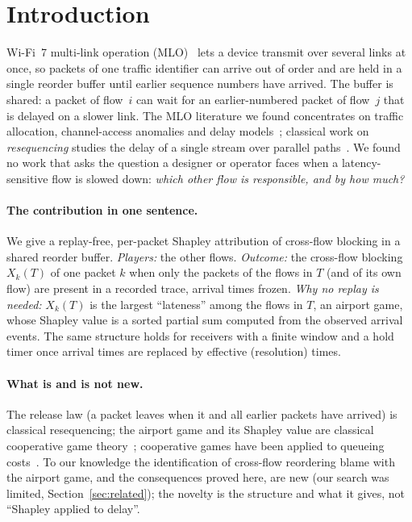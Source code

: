 \documentclass[11pt]{article}
\theoremstyle{definition}
\begin{document}
\section{Introduction}
Wi-Fi~7 multi-link operation (MLO)~\cite{ieee80211be2024} lets a device transmit over several links at once, so packets of one traffic identifier can arrive out of order and are held in a single reorder buffer until earlier sequence numbers have arrived.
The buffer is shared: a packet of flow~$i$ can wait for an earlier-numbered packet of flow~$j$ that is delayed on a slower link.
The MLO literature we found concentrates on traffic allocation, channel-access anomalies and delay models~\cite{lopezraventos2022mlo,carrascosa2023understanding}; classical work on \emph{resequencing} studies the delay of a single stream over parallel paths~\cite{baccelli1984resequencing,han2005resequencing}.
We found no work that asks the question a designer or operator faces when a latency-sensitive flow is slowed down: \emph{which other flow is responsible, and by how much?}

\paragraph{The contribution in one sentence.}
We give a replay-free, per-packet Shapley attribution of cross-flow blocking in a shared reorder buffer. \emph{Players:} the other flows. \emph{Outcome:} the cross-flow blocking $X_k(T)$ of one packet $k$ when only the packets of the flows in $T$ (and of its own flow) are present in a recorded trace, arrival times frozen. \emph{Why no replay is needed:} $X_k(T)$ is the largest ``lateness'' among the flows in $T$, an airport game, whose Shapley value is a sorted partial sum computed from the observed arrival events. The same structure holds for receivers with a finite window and a hold timer once arrival times are replaced by effective (resolution) times.

\paragraph{What is and is not new.} The release law (a packet leaves when it and all earlier packets have arrived) is classical resequencing; the airport game and its Shapley value are classical cooperative game theory~\cite{littlechild1973airport,dubey1982airport}; cooperative games have been applied to queueing costs~\cite{maniquet2003queueing,mitra2023shared}. To our knowledge the identification of cross-flow reordering blame with the airport game, and the consequences proved here, are new (our search was limited, Section~\ref{sec:related}); the novelty is the structure and what it gives, not ``Shapley applied to delay''.
\end{document}
